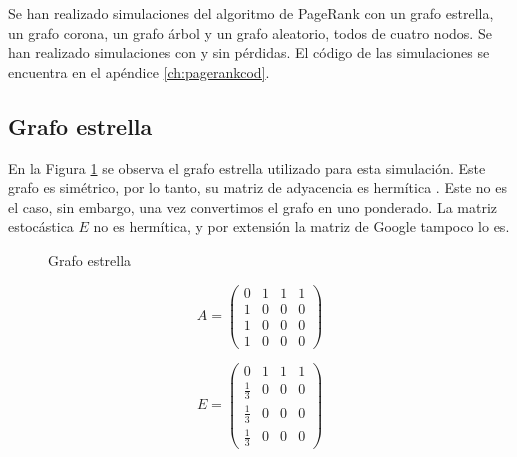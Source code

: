 Se han realizado simulaciones del algoritmo de PageRank con un grafo estrella, un grafo corona, un grafo árbol y un grafo aleatorio, todos de cuatro nodos. Se han realizado simulaciones con y sin pérdidas. El código de las simulaciones se encuentra en el apéndice \ref{ch:pagerankcod}.

\subsection{Grafo estrella}

En la Figura \ref{fig:star} se observa el grafo estrella utilizado para esta simulación. Este grafo es simétrico, por lo tanto, su matriz de adyacencia es hermítica%
. Este no es el caso, sin embargo, una vez convertimos el grafo en uno ponderado. La matriz estocástica $E$ no es hermítica, y por extensión la matriz de Google tampoco lo es.

\begin{figure}[H]
    \centering
    \caption[Grafo estrella]{Grafo estrella}
    \label{fig:star}
\end{figure}

\begin{equation}
    A =
    \begin{pmatrix}
        0 & 1 & 1 & 1 \\
        1 & 0 & 0 & 0 \\
        1 & 0 & 0 & 0 \\
        1 & 0 & 0 & 0
    \end{pmatrix}
\end{equation}

\begin{equation}
    E = 
    \begin{pmatrix}
        0 & 1 & 1 & 1 \\
        \frac{1}{3} & 0 & 0 & 0 \\
        \frac{1}{3} & 0 & 0 & 0 \\
        \frac{1}{3} & 0 & 0 & 0
    \end{pmatrix}
\end{equation}

